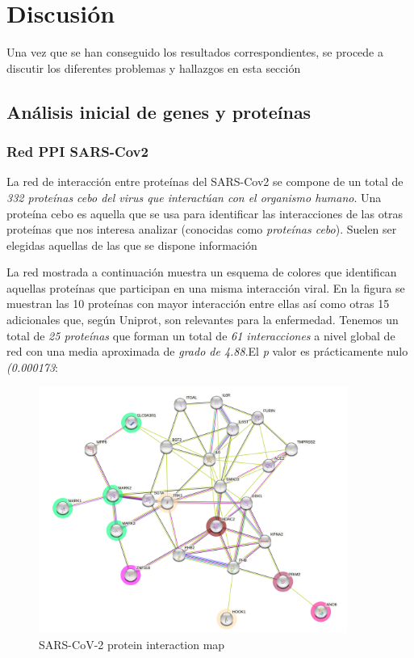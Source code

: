 \section{Discusión}

Una vez que se han conseguido los resultados correspondientes, se procede a discutir los diferentes problemas y hallazgos en esta sección

\subsection{Análisis inicial de genes y proteínas}

\subsubsection{Red PPI SARS-Cov2}

La red de interacción entre proteínas del SARS-Cov2 se compone de un total de \emph{332 proteínas cebo del virus que interactúan con el organismo humano}. Una proteína cebo es aquella que se usa para identificar las interacciones de las otras proteínas que nos interesa analizar (conocidas como \textit{proteínas cebo}). Suelen ser elegidas aquellas de las que se dispone información 

\newline

La red mostrada a continuación muestra un esquema de colores que identifican aquellas proteínas que participan en una misma interacción viral. En la figura se muestran las 10 proteínas con mayor interacción entre ellas así como otras 15 adicionales que, según Uniprot, son relevantes para la enfermedad. Tenemos un total de \emph{25 proteínas} que forman un total de \emph{61 interacciones} a nivel global de red con una media aproximada de \emph{grado de 4.88}.El \textit{p} valor es prácticamente nulo \textit{(0.000173}:

	\begin{figure}[h!]
		\includegraphics[width=0.9\textwidth]{figures/PPInetSARSCov2BaitProt.png}
		\caption{SARS-CoV-2 protein interaction map}
		\label{fig:ppi_net}
	\end{figure}
	

